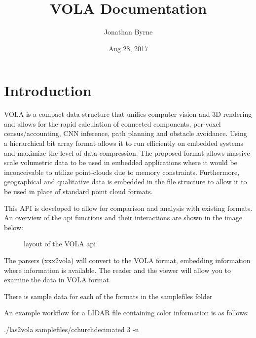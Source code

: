 \documentclass[letterpaper,10pt,english]{sphinxmanual}
\title{VOLA Documentation}
\date{Aug 28, 2017}
\author{Jonathan Byrne}
\begin{document}
\maketitle
\sphinxtableofcontents
{}\label{\detokenize{index::doc}}



\chapter{Introduction}
\label{\detokenize{intro:introduction}}\label{\detokenize{intro:welcome-to-the-vola-documentation}}\label{\detokenize{intro::doc}}
VOLA is a compact data structure that unifies computer vision
and 3D rendering and allows for the rapid calculation of connected
components, per-voxel census/accounting, CNN inference, path planning
and obstacle avoidance. Using a  hierarchical bit array format allows
it to run efficiently on embedded systems and maximize the level of data
compression. The proposed format allows massive scale volumetric data to
be used in embedded applications where it would be inconceivable to
utilize point-clouds due to memory constraints. Furthermore, geographical
and qualitative data is embedded in the file structure to allow it to be
used in place of standard point cloud formats.


This API is developed to allow for comparison and analysis with existing
formats. An overview of the api functions and their interactions are shown
in the image below:

\begin{figure}[htbp]
\centering
\capstart

\noindent{}
\caption{layout of the VOLA api}\label{\detokenize{intro:id1}}\end{figure}

The parsers (xxx2vola) will convert to the VOLA format, embedding information
where information is available. The reader and the viewer will allow you to
examine the data in VOLA format.

There is sample data for each of the formats in the samplefiles folder

An example workflow for a LIDAR file containing color information is as follows:

./las2vola samplefiles/cchurchdecimated 3 -n
\end{document}
